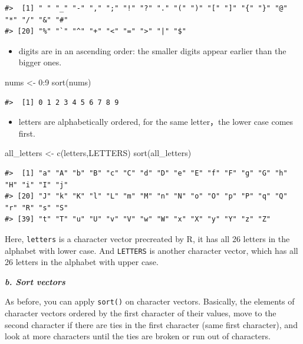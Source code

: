 \documentclass[
]{book}
\newenvironment{Shaded}{\begin{snugshade}}{\end{snugshade}}
\newcommand{\DecValTok}[1]{\textcolor[rgb]{0.00,0.00,0.81}{#1}}
\newcommand{\FunctionTok}[1]{\textcolor[rgb]{0.00,0.00,0.00}{#1}}
\newcommand{\NormalTok}[1]{#1}
\newcommand{\OtherTok}[1]{\textcolor[rgb]{0.56,0.35,0.01}{#1}}
\newcommand{\SpecialCharTok}[1]{\textcolor[rgb]{0.00,0.00,0.00}{#1}}
\providecommand{\tightlist}{%
  \setlength{\itemsep}{0pt}\setlength{\parskip}{0pt}}
\begin{document}
\begin{verbatim}
#>  [1] " " "_" "-" "," ";" "!" "?" "." "(" ")" "[" "]" "{" "}" "@" "*" "/" "&" "#"
#> [20] "%" "`" "^" "+" "<" "=" ">" "|" "$"
\end{verbatim}

\begin{itemize}
\tightlist
\item
  digits are in an ascending order: the smaller digits appear earlier than the bigger ones.
\end{itemize}

\begin{Shaded}
\begin{Highlighting}[]
\NormalTok{nums }\OtherTok{\textless{}{-}} \DecValTok{0}\SpecialCharTok{:}\DecValTok{9}
\FunctionTok{sort}\NormalTok{(nums)}
\end{Highlighting}
\end{Shaded}

\begin{verbatim}
#>  [1] 0 1 2 3 4 5 6 7 8 9
\end{verbatim}

\begin{itemize}
\tightlist
\item
  letters are alphabetically ordered, for the same letter，the lower case comes first.
\end{itemize}

\begin{Shaded}
\begin{Highlighting}[]
\NormalTok{all\_letters }\OtherTok{\textless{}{-}} \FunctionTok{c}\NormalTok{(letters,LETTERS)}
\FunctionTok{sort}\NormalTok{(all\_letters)}
\end{Highlighting}
\end{Shaded}

\begin{verbatim}
#>  [1] "a" "A" "b" "B" "c" "C" "d" "D" "e" "E" "f" "F" "g" "G" "h" "H" "i" "I" "j"
#> [20] "J" "k" "K" "l" "L" "m" "M" "n" "N" "o" "O" "p" "P" "q" "Q" "r" "R" "s" "S"
#> [39] "t" "T" "u" "U" "v" "V" "w" "W" "x" "X" "y" "Y" "z" "Z"
\end{verbatim}

Here, \texttt{letters} is a character vector precreated by R, it has all 26 letters in the alphabet with lower case. And \texttt{LETTERS} is another character vector, which has all 26 letters in the alphabet with upper case.

\textbf{\emph{b. Sort vectors}}

As before, you can apply \texttt{sort()} on character vectors. Basically, the elements of character vectors ordered by the first character of their values, move to the second character if there are ties in the first character (same first character), and look at more characters until the ties are broken or run out of characters.
\end{document}
